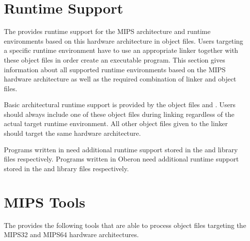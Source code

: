 \section{Runtime Support}

The \ecs{} provides runtime support for the MIPS architecture and runtime environments based on this hardware architecture in object files.
Users targeting a specific runtime environment have to use an appropriate linker together with these object files in order create an executable program.
This section gives information about all supported runtime environments based on the MIPS hardware architecture as well as the required combination of linker and object files.

Basic architectural runtime support is provided by the object files  and .
Users should always include one of these object files during linking regardless of the actual target runtime environment.
All other object files given to the linker should target the same hardware architecture.

Programs written in \cpp{} need additional runtime support stored in the  and  library files respectively.
Programs written in Oberon need additional runtime support stored in the  and  library files respectively.
\seecpp\seeoberon

\section{MIPS Tools}

The \ecs{} provides the following tools that are able to process object files targeting the MIPS32 and MIPS64 hardware architectures.
\interface

\cdmipsa
\cdmipsb
\cppmipsa
\cppmipsb
\falmipsa
\falmipsb
\obmipsa
\obmipsb
\mipsaasm
\mipsbasm
\mipsadism
\mipsbdism
\linkbin

\concludechapter
